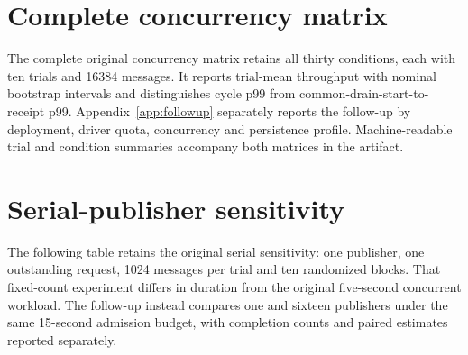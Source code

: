 \documentclass[11pt]{article}
\theoremstyle{definition}
\begin{document}
\appendix
\section{Complete concurrency matrix}\label{app:matrix}
The complete original concurrency matrix retains all thirty conditions, each with ten trials and 16384 messages. It reports trial-mean throughput with nominal bootstrap intervals and distinguishes cycle p99 from common-drain-start-to-receipt p99. Appendix~\ref{app:followup} separately reports the follow-up by deployment, driver quota, concurrency and persistence profile. Machine-readable trial and condition summaries accompany both matrices in the artifact.

\begingroup\small\setlength{\tabcolsep}{3.5pt}

\endgroup
\FloatBarrier

\section{Serial-publisher sensitivity}\label{app:serial}
The following table retains the original serial sensitivity: one publisher, one outstanding request, 1024 messages per trial and ten randomized blocks. That fixed-count experiment differs in duration from the original five-second concurrent workload. The follow-up instead compares one and sixteen publishers under the same 15-second admission budget, with completion counts and paired estimates reported separately.

\begin{table}[htbp]\centering\small

\caption{Original fixed-count, one-publisher sensitivity.}
\label{tab:serial}
\end{table}
\FloatBarrier
\end{document}
